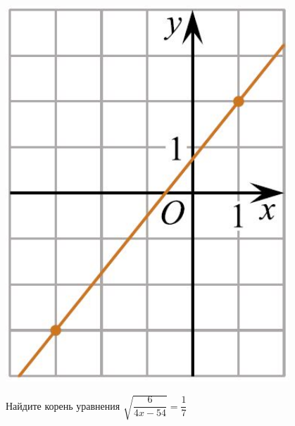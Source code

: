 \begin{listofex}
\begin{minipage}[c]{0.2\textwidth}
		\includegraphics[align=t, width=0.8\textwidth]{pics/G112M3C2-1}
	\end{minipage}
	\item Найдите корень уравнения
	\( \sqrt{\dfrac{6}{4x-54}}=\dfrac{1}{7} \)
\end{listofex}
%	
%	
%	
%	
%	
%	
